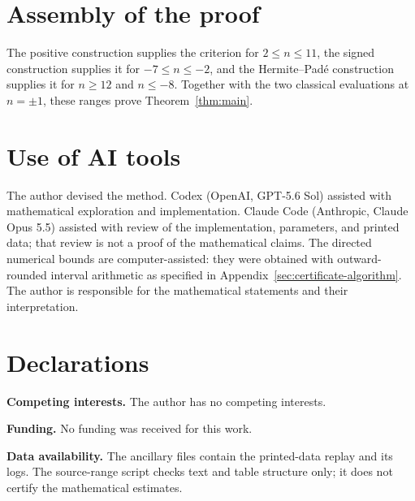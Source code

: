\documentclass{amsart}
\numberwithin{equation}{section}
\numberwithin{table}{section}
\begin{document}
\section{Assembly of the proof}
The positive construction supplies the criterion for $2\le n\le11$, the
signed construction supplies it for $-7\le n\le-2$, and the Hermite--Pad\'e
construction supplies it for $n\ge12$ and $n\le-8$.  Together with the two
classical evaluations at $n=\pm1$, these ranges prove Theorem~\ref{thm:main}.

\section*{Use of AI tools}
The author devised the method.  Codex (OpenAI, GPT-5.6 Sol) assisted with
mathematical exploration and implementation.  Claude Code (Anthropic,
Claude Opus 5.5) assisted with review of the implementation, parameters, and
printed data; that review is not a proof of the mathematical claims.  The
directed numerical bounds are computer-assisted:
they were obtained with outward-rounded interval arithmetic as specified in
Appendix~\ref{sec:certificate-algorithm}.  The author is responsible for the
mathematical statements and their interpretation.

\section*{Declarations}
\textbf{Competing interests.} The author has no competing interests.

\textbf{Funding.} No funding was received for this work.

\textbf{Data availability.} The ancillary files contain the printed-data
replay and its logs. The source-range script checks text and table structure
only; it does not certify the mathematical estimates.
\end{document}
